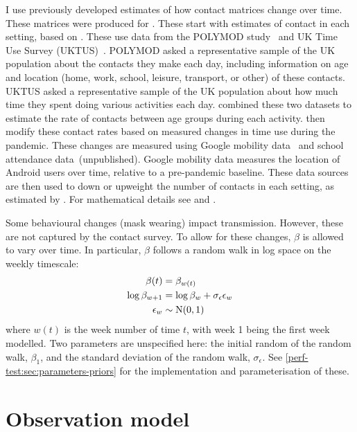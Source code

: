 \documentclass[thesis.tex]{subfiles}
\begin{document}
I use previously developed estimates of how contact matrices change over time.
These matrices were produced for \textcite{birrellRealtime}.
These start with estimates of contact in each setting, based on \textcite{vanleeuwenAugmenting}.
These use data from the POLYMOD study~\autocite{mossongSocial} and UK Time Use Survey (UKTUS)~\autocite{UKTUS}.
POLYMOD asked a representative sample of the UK population about the contacts they make each day, including information on age and location (home, work, school, leisure, transport, or other) of these contacts.
UKTUS asked a representative sample of the UK population about how much time they spent doing various activities each day.
\Textcite{vanleeuwenAugmenting} combined these two datasets to estimate the rate of contacts between age groups during each activity.
\Textcite{birrellRealtime} then modify these contact rates based on measured changes in time use during the pandemic.
These changes are measured using Google mobility data~\autocite{googleCOVID19} and school attendance data~(unpublished).
Google mobility data measures the location of Android users over time, relative to a pre-pandemic baseline.
These data sources are then used to down or upweight the number of contacts in each setting, as estimated by \textcite{vanleeuwenAugmenting}.
For mathematical details see \textcite{vanleeuwenAugmenting} and \textcite[supplementary material]{birrellRealtime}.

Some behavioural changes (\eg mask wearing) impact transmission.
However, these are not captured by the contact survey.
To allow for these changes, $\beta$ is allowed to vary over time.
In particular, $\beta$ follows a random walk in log space on the weekly timescale:
\begin{align}
    \beta(t) &= \beta_{w(t)} \\
    \log\beta_{w+1} &= \log\beta_w + \sigma_\epsilon \epsilon_w \\
    \epsilon_w &\sim \operatorname{N}(0, 1)
\end{align}
where $w(t)$ is the week number of time $t$, with week 1 being the first week modelled.
Two parameters are unspecified here: the initial random of the random walk, $\beta_1$, and the standard deviation of the random walk, $\sigma_\epsilon$.
See \cref{perf-test:sec:parameters-priors} for the implementation and parameterisation of these.

\section{Observation model} \label{SEIR:sec:observation}
\end{document}
